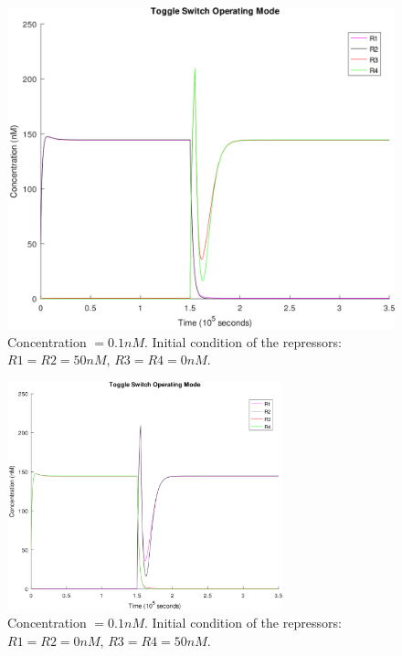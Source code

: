     \begin{figure}[!htbp]
      \centering
      \includegraphics[width=1.1\textwidth]{img/switch-A-1.png}
      \caption{Concentration $= 0.1nM$. Initial condition of the repressors: $R1 = R2 = 50nM$, $R3 = R4 = 0nM$.}
      \label{fig.switch-A}
    \end{figure}

    \begin{figure}[!htbp]
      \centering
      \includegraphics[width=0.71\textwidth]{img/switch-B-1.png}
      \caption{Concentration $= 0.1nM$. Initial condition of the repressors: $R1 = R2 = 0nM$, $R3 = R4 = 50nM$.}
      \label{fig.switch-B}
    \end{figure}

